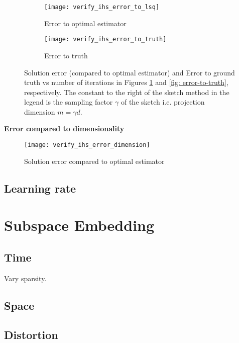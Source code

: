 \documentclass[twoside]{article}
\theoremstyle{definition}\newtheorem{thm}{Theorem}[section]
\theoremstyle{definition}\newtheorem{mydef}[thm]{Definition}
\theoremstyle{definition}\newtheorem{rem}[thm]{Remark}
\theoremstyle{definition}\newtheorem{prop}[thm]{Proposition}
\theoremstyle{definition}\newtheorem{example}[thm]{Example}
\theoremstyle{definition}\newtheorem{claim}[thm]{Claim}
\theoremstyle{definition}\newtheorem{Qu}[thm]{Question}
\theoremstyle{definition}\newtheorem{Lemma}[thm]{Lemma}
\theoremstyle{definition}\newtheorem{Cor}[thm]{Corollary}
\theoremstyle{definition}\newtheorem{Fact}[]{Fact}
\begin{document}
\begin{figure}
    \centering
    \begin{subfigure}{0.49\textwidth}
    \centering
        \texttt{[image: verify\_ihs\_error\_to\_lsq]}
        \caption{Error to optimal estimator}
        \label{fig: error-to-lsq}
    \end{subfigure}%
    \begin{subfigure}{0.49\textwidth}
    \centering
        \texttt{[image: verify\_ihs\_error\_to\_truth]}
        \caption{Error to truth}
        \label{fig: error-to-truth}
    \end{subfigure}
    \caption{Solution error (compared to optimal estimator) and Error to
    ground truth vs number of
    iterations in Figures \ref{fig: error-to-lsq} and \ref{fig:
    error-to-truth}, respectively.
    The constant to the right of the sketch method in the legend
    is the sampling factor $\gamma$ of the sketch i.e. projection dimension
    $m = \gamma d$.}
    \label{fig: ihs-sketch-errors}
\end{figure}




\textbf{Error compared to dimensionality}


\begin{figure}
  \centering
  \texttt{[image: verify\_ihs\_error\_dimension]}
  \caption{Solution error compared to optimal estimator}
  \label{fig: error-vary-columns}
\end{figure}





\subsection{Learning rate}

\section{Subspace Embedding}

\subsection{Time}
Vary sparsity.
\subsection{Space}

\subsection{Distortion}
\end{document}
